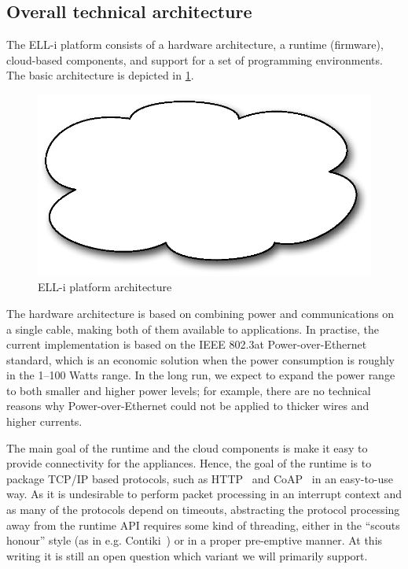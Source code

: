 \documentclass[draft,a4paper]{siamltex}
\begin{document}
\subsection{Overall technical architecture}

The ELL-i platform consists of a hardware architecture, a runtime
(firmware), cloud-based components, and support for a set of
programming environments.  The basic architecture is depicted in
\ref{fig:arch}.

\begin{figure}
\centering
\includegraphics[scale=.4]{figure-arch.eps}
\caption{ELL-i platform architecture}
\label{fig:arch}
\end{figure}

The hardware architecture is based on combining power and
communications on a single cable, making both of them available to
applications.  In practise, the current implementation is based on the
IEEE 802.3at Power-over-Ethernet standard, which is an economic
solution when the power consumption is roughly in the 1--100 Watts
range.  In the long run, we expect to expand the power range to both
smaller and higher power levels; for example, there are no technical
reasons why Power-over-Ethernet could not be applied to thicker wires
and higher currents.

The main goal of the runtime and the cloud components is make it easy
to provide connectivity for the appliances.  Hence, the goal of the
runtime is to package TCP/IP based protocols, such as HTTP~\cite{HTTP}
and CoAP~\cite{CoAP} in an easy-to-use way.  As it is undesirable to
perform packet processing in an interrupt context and as many of the
protocols depend on timeouts, abstracting the protocol processing away
from the runtime API requires some kind of threading, either in the
``scouts honour'' style (as in e.g. Contiki~\cite{Contiki-scheduler})
or in a proper pre-emptive manner.  At this writing it is still an
open question which variant we will primarily support.
\end{document}
